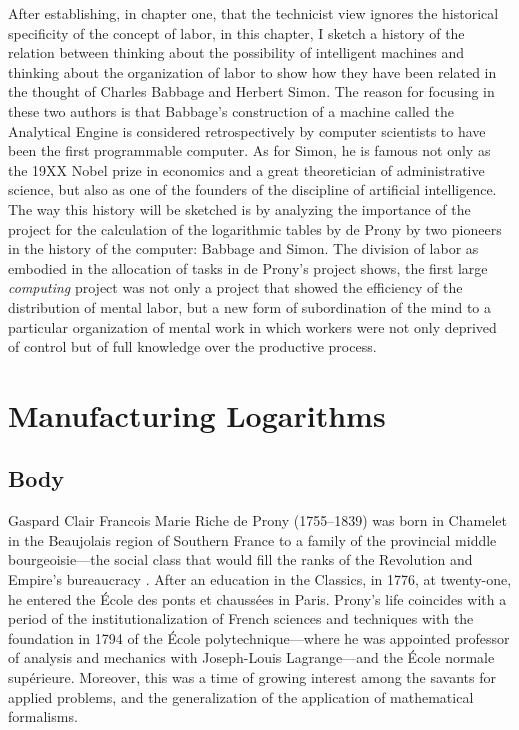 \documentclass[version=last,draft=false,paper=A4,portrait,twoside=true,twocolumn=false,headinclude=false,footinclude=false,mpinclude=true,fontsize=12,BCOR=20mm,DIV=calc,pagesize=auto,open=right,chapterprefix=true,numbers=autoendperiod,headsepline=false,headings=twolinechapter,parskip=false]{scrbook}
\begin{document}
After establishing, in chapter one, that the technicist view ignores the
historical specificity of the concept of labor, in this chapter, I sketch a
history of the relation between thinking about the possibility of
intelligent machines and thinking about the organization of labor to show
how they have been related in the thought of Charles Babbage and Herbert
Simon. The reason for focusing in these two authors is that Babbage's
construction of a machine called the Analytical Engine is considered
retrospectively by computer scientists to have been the first programmable
computer. As for Simon, he is famous not only as the 19XX Nobel prize in
economics and a great theoretician of administrative science, but also as
one of the founders of the discipline of artificial intelligence. The way
this history will be sketched is by analyzing the importance of the project
for the calculation of the logarithmic tables by de Prony by two pioneers
in the history of the computer: Babbage and Simon. The division of labor as
embodied in the allocation of tasks in de Prony's project shows, the first
large \emph{computing} project was not only a project that showed the efficiency
of the distribution of mental labor, but a new form of subordination of the
mind to a particular organization of mental work in which workers were not
only deprived of control but of full knowledge over the productive process.

\section{Manufacturing Logarithms}
\label{sec:org2b8c838}
\subsection{Body}
\label{sec:orged8c157}
Gaspard Clair Francois Marie Riche de Prony (1755--1839) was born in
Chamelet in the Beaujolais region of Southern France to a family of the
provincial middle bourgeoisie---the social class that would fill the ranks
of the Revolution and Empire's bureaucracy \autocite{picon_et_al1984}. After
an education in the Classics, in 1776, at twenty-one, he entered the École
des ponts et chaussées in Paris. Prony's life coincides with a period of
the institutionalization of French sciences and techniques with the
foundation in 1794 of the École polytechnique---where he was appointed
professor of analysis and mechanics with Joseph-Louis Lagrange---and the
École normale supérieure. Moreover, this was a time of growing interest
among the savants for applied problems, and the generalization of the
application of mathematical formalisms.
\end{document}
